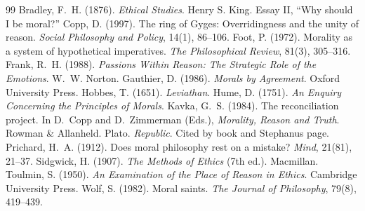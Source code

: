 \documentclass{situationist-preprint}
\begin{document}
\begin{thebibliography}{99}\small
{} Bradley, F.~H. (1876). \emph{Ethical Studies}. Henry S. King. Essay II, \enquote{Why should I be moral?}
 Copp, D. (1997). The ring of Gyges: Overridingness and the unity of reason. \emph{Social Philosophy and Policy}, 14(1), 86--106.
 Foot, P. (1972). Morality as a system of hypothetical imperatives. \emph{The Philosophical Review}, 81(3), 305--316.
 Frank, R.~H. (1988). \emph{Passions Within Reason: The Strategic Role of the Emotions}. W.~W. Norton.
 Gauthier, D. (1986). \emph{Morals by Agreement}. Oxford University Press.
 Hobbes, T. (1651). \emph{Leviathan}.
 Hume, D. (1751). \emph{An Enquiry Concerning the Principles of Morals}.
 Kavka, G.~S. (1984). The reconciliation project. In D.~Copp and D.~Zimmerman (Eds.), \emph{Morality, Reason and Truth}. Rowman \& Allanheld.
 Plato. \emph{Republic}. Cited by book and Stephanus page.
 Prichard, H.~A. (1912). Does moral philosophy rest on a mistake? \emph{Mind}, 21(81), 21--37.
 Sidgwick, H. (1907). \emph{The Methods of Ethics} (7th ed.). Macmillan.
 Toulmin, S. (1950). \emph{An Examination of the Place of Reason in Ethics}. Cambridge University Press.
 Wolf, S. (1982). Moral saints. \emph{The Journal of Philosophy}, 79(8), 419--439.
\end{thebibliography}
\end{document}
